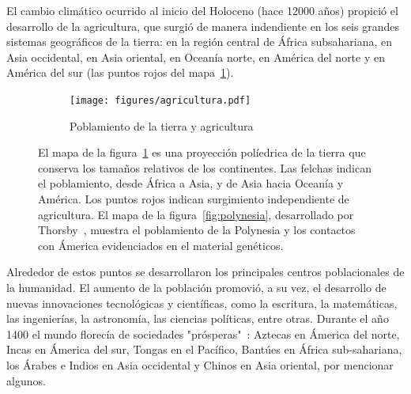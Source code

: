 \documentclass[a4paper,10pt]{book}
\begin{document}
El cambio climático ocurrido al inicio del Holoceno (hace 12000 años) propició el desarrollo de la agricultura, que surgió de manera indendiente en los seis grandes sistemas geográficos de la tierra: en la región central de África subsahariana, en Asia occidental, en Asia oriental, en Oceanía norte, en América del norte y en América del sur (las puntos rojos del mapa~\ref{fig:agricultura}).
\begin{figure}[ht!]
    \centering
    \begin{subfigure}[b]{0.6\textwidth}
     \texttt{[image: figures/agricultura.pdf]}
     \caption{Poblamiento de la tierra y agricultura}
     \label{fig:agricultura}
    \end{subfigure}
    \caption{
    El mapa de la figura~\ref{fig:agricultura} es una proyección políedrica de la tierra que conserva los tamaños relativos de los continentes.
    Las felchas indican el poblamiento, desde África a Asia, y de Asia hacia Oceanía y América.
    Los puntos rojos indican surgimiento independiente de agricultura.
    El mapa de la figura~\ref{fig:polynesia}, desarrollado por Thorsby~\cite{thorsby2016-polynesiaAmerica}, muestra el poblamiento de la Polynesia y los contactos con Ámerica evidenciados en el material genéticos. }%
    \label{fig:poblamiento}
\end{figure}
Alrededor de estos puntos se desarrollaron los principales centros poblacionales de la humanidad.
El aumento de la población promovió, a su vez, el desarrollo de nuevas innovaciones tecnológicas y científicas, como la escritura, la matem\'aticas, las ingenier\'ias, la astronomía, las ciencias políticas, entre otras.
Durante el año 1400 el mundo florecía de sociedades "prósperas"~\cite{dussel2004-sistemaMundo}: Aztecas en Ámerica del norte, Incas en Ámerica del sur, Tongas en el Pacífico, Bantúes en África sub-sahariana, los Árabes e Indios en Asia occidental y Chinos en Asia oriental, por mencionar algunos.

\end{document}
